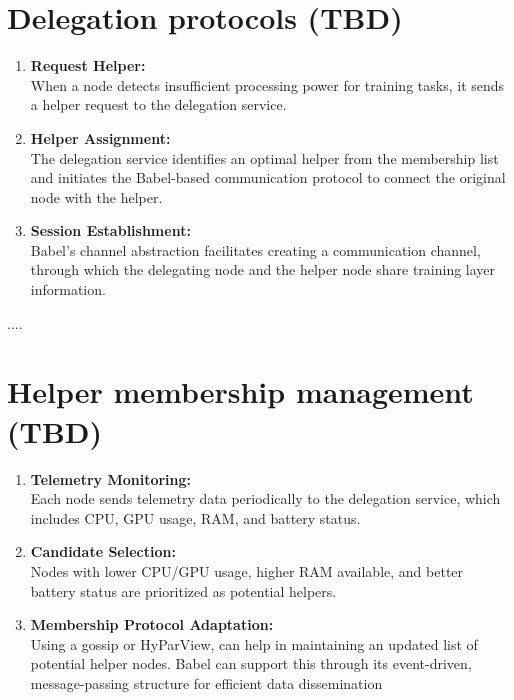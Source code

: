 \section{Delegation protocols (TBD)}
\label{sec:delegation_protocols}


\begin{enumerate}
	\item \textbf{Request Helper:} \\ When a node detects insufficient processing power for training tasks, it sends a helper request to the delegation service.
	\item \textbf{Helper Assignment:} \\ The delegation service identifies an optimal helper from the membership list and initiates the Babel-based communication protocol to connect the original node with the helper.
	\item \textbf{Session Establishment:} \\ Babel's channel abstraction facilitates creating a communication channel, through which the delegating node and the helper node share training layer information.

\end{enumerate}

....


\section{Helper membership management (TBD)}
\label{sec:helper_membership_management}

\begin{enumerate}
	\item \textbf{Telemetry Monitoring:} \\ Each node sends telemetry data periodically to the delegation service, which includes CPU, GPU usage, RAM, and battery status.

	\item \textbf{Candidate Selection: } \\ Nodes with lower CPU/GPU usage, higher RAM available, and better battery status are prioritized as potential helpers.
	
	\item \textbf{Membership Protocol Adaptation:} \\ Using a gossip or HyParView, can help in maintaining an updated list of potential helper nodes. Babel can support this through its event-driven, message-passing structure for efficient data dissemination​


\end{enumerate}

